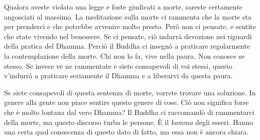 Qualora aveste violato una legge e foste giudicati a morte, sareste
certamente angosciati al massimo. La meditazione sulla morte ci rammenta
che la morte sta per prenderci e che potrebbe avvenire molto presto.
Però non ci pensate, e sentite che state vivendo nel benessere. Se ci
pensate, ciò indurrà devozione nei riguardi della pratica del Dhamma.
Perciò il Buddha ci insegnò a praticare regolarmente la contemplazione
della morte. Chi non lo fa, vive nella paura. Non conosce se stesso. Se
invece ve ne rammentate e siete consapevoli di voi stessi, questo
v'indurrà a praticare seriamente il Dhamma e a liberarvi da questa
paura.

Se siete consapevoli di questa sentenza di morte, vorrete trovare una
soluzione. In genere alla gente non piace sentire questo genere di cose.
Ciò non significa forse che è molto lontana dal vero Dhamma? Il Buddha
ci raccomandò di rammentarci della morte, ma questo discorso turba le
persone. È il \emph{kamma} degli esseri. Hanno una certa qual conoscenza
di questo dato di fatto, ma essa non è ancora chiara.

